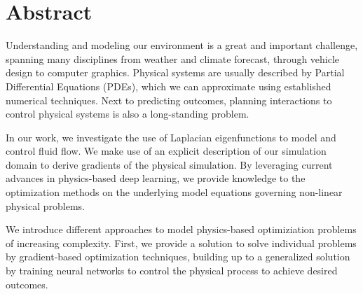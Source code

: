 \chapter*{Abstract}

Understanding and modeling our environment is a great and important challenge,
spanning many disciplines from weather and climate forecast, through vehicle
design to computer graphics. Physical systems are usually described by Partial
Differential Equations (PDEs), which we can approximate using established
numerical techniques. Next to predicting outcomes, planning interactions to
control physical systems is also a long-standing problem.

In our work, we investigate the use of Laplacian eigenfunctions to model and
control fluid flow. We make use of an explicit description of our simulation
domain to derive gradients of the physical simulation. By leveraging current
advances in physics-based deep learning, we provide knowledge to the
optimization methods on the underlying model equations governing non-linear
physical problems.

We introduce different approaches to model physics-based optimiziation problems
of increasing complexity. First, we provide a solution to solve individual
problems by gradient-based optimization techniques, building up to a generalized
solution by training neural networks to control the physical process to achieve
desired outcomes.

\vfill
\cleardoublepage

\selectthesislanguage

\setcounter{romanPage}{\value{page}}
